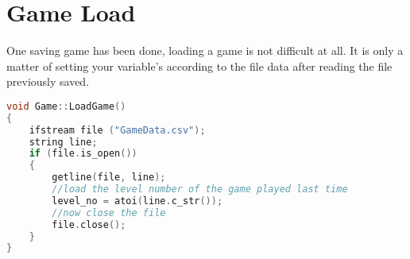 \documentclass[11pt,fleqn]{book} %
\begin{document}
    \section{Game Load}
    One saving game has been done, loading a game is not difficult at all. It is only a matter of setting your variable's according to the file data after reading the file previously saved. \\
    \begin{lstlisting}[language=C++, caption=Loading a game]
void Game::LoadGame()
{
    ifstream file ("GameData.csv");
    string line;
    if (file.is_open())
    {
        getline(file, line);
        //load the level number of the game played last time
        level_no = atoi(line.c_str());
        //now close the file
        file.close();
    }
}
\end{lstlisting}
\end{document}
